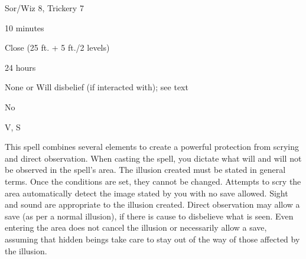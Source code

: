 
\begin{description*}
\item[Level:] Sor/Wiz 8, Trickery 7
\item[Casting Time:] 10 minutes
\item[Range:] Close (25 ft. + 5 ft./2 levels)
\item[Duration:] 24 hours
\item[Saving Throw:] None or Will disbelief (if interacted with); see text
\item[Spell Resistance:] No
\item[Components:] V, S
\end{description*}

This spell combines several elements to create a powerful protection from scrying
and direct observation. When casting the spell, you dictate what will and will
not be observed in the spell's area. The illusion created must be stated in general
terms. Once the conditions are set, they cannot be changed.
Attempts to scry the area automatically detect the image stated by you with no
save allowed. Sight and sound are appropriate to the illusion created.
Direct observation may allow a save (as per a normal illusion), if there is cause
to disbelieve what is seen. Even entering the area does not cancel the illusion
or necessarily allow a save, assuming that hidden beings take care to stay out
of the way of those affected by the illusion.